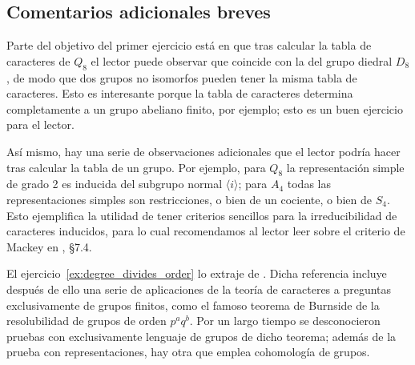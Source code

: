 \documentclass[11pt, reqno]{amsart}
\begin{document}
\begin{additional}
\appendix
\section{Comentarios adicionales breves}
Parte del objetivo del primer ejercicio está en que tras calcular la tabla de caracteres de $Q_8$ el lector puede observar que coincide con
la del grupo diedral $D_8$, de modo que dos grupos no isomorfos pueden tener la misma tabla de caracteres.
Esto es interesante porque la tabla de caracteres determina completamente a un grupo abeliano finito, por ejemplo; esto es un buen ejercicio
para el lector.

Así mismo, hay una serie de observaciones adicionales que el lector podría hacer tras calcular la tabla de un grupo.
Por ejemplo, para $Q_8$ la representación simple de grado 2 es inducida del subgrupo normal $\langle i \rangle$;
para $A_4$ todas las representaciones simples son restricciones, o bien de un cociente, o bien de $S_4$.
Esto ejemplifica la utilidad de tener criterios sencillos para la irreducibilidad de caracteres inducidos, para lo cual recomendamos al
lector leer sobre el criterio de Mackey en \cite{serre:representations}, \S 7.4.

El ejercicio~\ref{ex:degree_divides_order} lo extraje de \cite{huppert:finite_i}.
Dicha referencia incluye después de ello una serie de aplicaciones de la teoría de caracteres a preguntas exclusivamente de grupos finitos,
como el famoso teorema de Burnside de la resolubilidad de grupos de orden $p^aq^b$.
Por un largo tiempo se desconocieron pruebas con exclusivamente lenguaje de grupos de dicho teorema; además de la prueba con
representaciones, hay otra que emplea cohomología de grupos.

\printbibliography
\end{additional}
\end{document}
